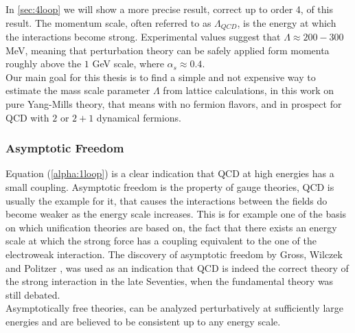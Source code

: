 In \cref{sec:4loop} we will show a more precise result, correct up to order 4, of this result. The momentum scale, often referred to as $\Lambda_{QCD}$, is the energy at which the interactions become strong. Experimental values \cite{dissertori_9._2016} suggest that $\Lambda \approx 200-300$ MeV, meaning that perturbation theory can be safely applied form momenta roughly above the $1$ GeV scale, where $\alpha_s\approx 0.4$. \\
Our main goal for this thesis is to find a simple and not expensive way to estimate the mass scale parameter $\Lambda$ from lattice calculations, in this work on pure Yang-Mills theory, that means with no fermion flavors, and in prospect for QCD with $2$ or $2+1$ dynamical fermions.

\subsubsection{Asymptotic Freedom}
Equation (\ref{alpha:1loop}) is a clear indication that QCD at high energies has a small coupling. Asymptotic freedom is the property of gauge theories, QCD is usually the example for it, that causes the interactions between the fields do become weaker as the energy scale increases. This is for example one of the basis on which unification theories are based on, the fact that there exists an energy scale at which the strong force has a coupling equivalent to the one of the electroweak interaction.  
The discovery of asymptotic freedom by Gross, Wilczek  and Politzer \cite{Gross-Wilczek}\cite{Politzer},  was used as an indication that QCD is indeed the correct theory of the strong interaction in the late Seventies, when the fundamental theory was still debated.\\
Asymptotically free theories, can be analyzed perturbatively at sufficiently large energies and are believed to be consistent up to any energy scale.

